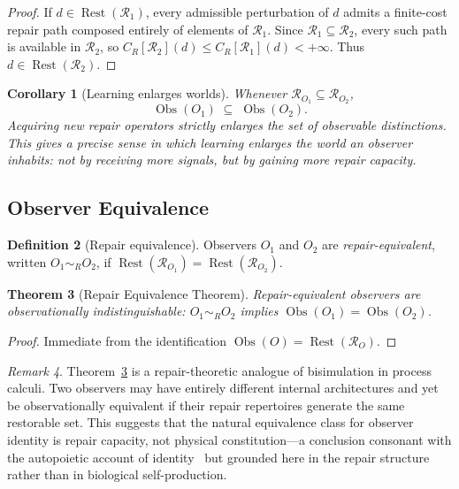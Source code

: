 \documentclass[12pt, oneside]{article}
\theoremstyle{plain}
\newtheorem{theorem}{Theorem}[section]
\newtheorem{corollary}[theorem]{Corollary}
\theoremstyle{definition}
\newtheorem{definition}[theorem]{Definition}
\theoremstyle{remark}
\newtheorem{remark}[theorem]{Remark}
\theoremstyle{definition}
\DeclareMathOperator{\Obs}{Obs}
\DeclareMathOperator{\Rest}{Rest}
\newcommand{\CR}{C_{\!R}}
\begin{document}
\begin{proof}
  If $d \in \Rest(\mathcal{R}_1)$, every admissible perturbation
  of $d$ admits a finite-cost repair path composed entirely of
  elements of $\mathcal{R}_1$.
  Since $\mathcal{R}_1 \subseteq \mathcal{R}_2$, every such path is
  available in $\mathcal{R}_2$, so $\CR[\mathcal{R}_2](d) \leq
  \CR[\mathcal{R}_1](d) < +\infty$.
  Thus $d \in \Rest(\mathcal{R}_2)$.
\end{proof}

\begin{corollary}[Learning enlarges worlds]
  Whenever $\mathcal{R}_{O_1} \subseteq \mathcal{R}_{O_2}$,
  \[
    \Obs(O_1) \;\subseteq\; \Obs(O_2).
  \]
  Acquiring new repair operators strictly enlarges the set of
  observable distinctions.
  This gives a precise sense in which learning enlarges the world an
  observer inhabits: not by receiving more signals, but by gaining
  more repair capacity.
\end{corollary}

\subsection{Observer Equivalence}

\begin{definition}[Repair equivalence]
  Observers $O_1$ and $O_2$ are \emph{repair-equivalent},
  written $O_1 \sim_R O_2$, if
  $\Rest(\mathcal{R}_{O_1}) = \Rest(\mathcal{R}_{O_2})$.
\end{definition}

\begin{theorem}[Repair Equivalence Theorem]
  Repair-equivalent observers are observationally indistinguishable:
  $O_1 \sim_R O_2$ implies $\Obs(O_1) = \Obs(O_2)$.
  \label{thm:equivalence}
\end{theorem}

\begin{proof}
  Immediate from the identification $\Obs(O) = \Rest(\mathcal{R}_O)$.
\end{proof}

\begin{remark}
  Theorem~\ref{thm:equivalence} is a repair-theoretic analogue of
  bisimulation in process calculi.
  Two observers may have entirely different internal architectures
  and yet be observationally equivalent if their repair repertoires
  generate the same restorable set.
  This suggests that the natural equivalence class for observer
  identity is repair capacity, not physical constitution---a
  conclusion consonant with the autopoietic account of
  identity~\cite{MaturanaVarela1980,VarelaThompsonRosch1991} but
  grounded here in the repair structure rather than in biological
  self-production.
\end{remark}
\end{document}
